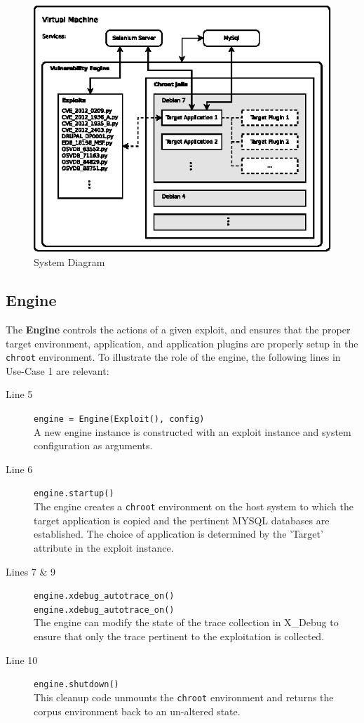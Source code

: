 \documentclass[letterpaper,twocolumn,10pt]{article}
\begin{document}
\begin{figure}[!tp]
\label{fig:diagram}
\begin{center}
\includegraphics[scale=1.17]{system_diagram.eps}
\end{center}
\caption{System Diagram}
\end{figure}


\subsection{Engine}
The {\bf Engine} controls the actions of a given exploit, and ensures that the proper target environment, application, and application plugins are properly setup in the {\tt chroot} environment. To illustrate the role of the engine, the following lines in Use-Case 1 are relevant:
\begin{description}
  \item[Line 5] {\tt \footnotesize    engine = Engine(Exploit(), config)} \\ A new engine instance is constructed with an exploit instance and system configuration as arguments.
  \item[Line 6] {\tt \footnotesize     engine.startup()} \\The engine creates a {\tt chroot} environment on the host system to which the target application is copied and the pertinent MYSQL databases are established. The choice of application is determined by the 'Target' attribute in the exploit instance. 
  \item[Lines 7 \& 9] {\tt \footnotesize engine.xdebug\_autotrace\_on()\\ engine.xdebug\_autotrace\_on()}\\The engine can modify the state of the trace collection in X\_Debug to ensure that only the trace pertinent to the exploitation is collected.
  \item[Line 10] {\tt \footnotesize engine.shutdown()}\\This cleanup code unmounts the {\tt chroot} environment and returns the corpus environment back to an un-altered state.
\end{description}
\end{document}
